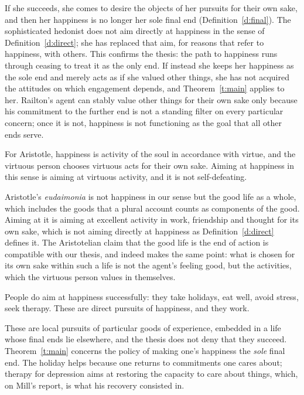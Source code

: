 \documentclass{situationist-preprint}
\begin{document}
\begin{reply}
If she succeeds, she comes to desire the objects of her pursuits for their own sake, and then her happiness is no longer her sole final end (Definition~\ref{d:final}). The sophisticated hedonist does not aim directly at happiness in the sense of Definition~\ref{d:direct}; she has replaced that aim, for reasons that refer to happiness, with others. This confirms the thesis: the path to happiness runs through ceasing to treat it as the only end. If instead she keeps her happiness as the sole end and merely acts as if she valued other things, she has not acquired the attitudes on which engagement depends, and Theorem~\ref{t:main} applies to her. Railton's agent can stably value other things for their own sake only because his commitment to the further end is not a standing filter on every particular concern; once it is not, happiness is not functioning as the goal that all other ends serve.
\end{reply}

\begin{objection}[Aristotle]\label{o:arist}
For Aristotle, happiness is activity of the soul in accordance with virtue, and the virtuous person chooses virtuous acts for their own sake. Aiming at happiness in this sense is aiming at virtuous activity, and it is not self-defeating.
\end{objection}

\begin{reply}
Aristotle's \emph{eudaimonia} is not happiness in our sense but the good life as a whole, which includes the goods that a plural account counts as components of the good. Aiming at it is aiming at excellent activity in work, friendship and thought for its own sake, which is not aiming directly at happiness as Definition~\ref{d:direct} defines it. The Aristotelian claim that the good life is the end of action is compatible with our thesis, and indeed makes the same point: what is chosen for its own sake within such a life is not the agent's feeling good, but the activities, which the virtuous person values in themselves.
\end{reply}

\begin{objection}\label{o:aim}
People do aim at happiness successfully: they take holidays, eat well, avoid stress, seek therapy. These are direct pursuits of happiness, and they work.
\end{objection}

\begin{reply}
These are local pursuits of particular goods of experience, embedded in a life whose final ends lie elsewhere, and the thesis does not deny that they succeed. Theorem~\ref{t:main} concerns the policy of making one's happiness the \emph{sole} final end. The holiday helps because one returns to commitments one cares about; therapy for depression aims at restoring the capacity to care about things, which, on Mill's report, is what his recovery consisted in.
\end{reply}
\end{document}
